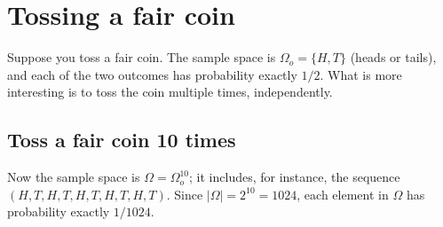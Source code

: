 \section{Tossing a fair coin}

Suppose you toss a fair coin. The sample space is $\Omega_o = \{H,T\}$ (heads or tails), and each of the two outcomes has probability exactly $1/2$. What is more interesting is to toss the coin multiple times, independently. 

\subsection{Toss a fair coin 10 times}

Now the sample space is $\Omega = \Omega_o^{10}$; it includes, for instance, the sequence $(H,T,H,T,H,T,H,T,H,T)$. Since $|\Omega| = 2^{10} = 1024$, each element in $\Omega$ has probability exactly $1/1024$.

